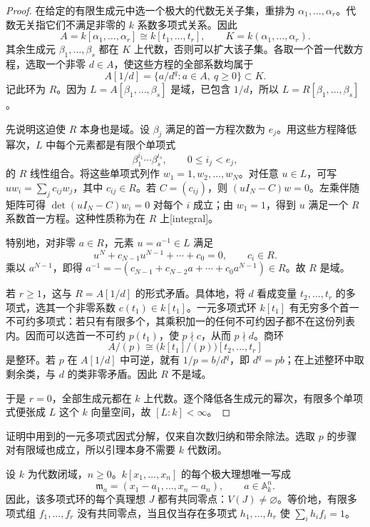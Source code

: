\begin{proof}
	在给定的有限生成元中选一个极大的代数无关子集，重排为 \(\alpha_1,\ldots,\alpha_r\)。代数无关指它们不满足非零的 \(k\) 系数多项式关系。因此
	\[
		A=k[\alpha_1,\ldots,\alpha_r]\cong k[t_1,\ldots,t_r],
		\qquad K=k(\alpha_1,\ldots,\alpha_r).
	\]
	其余生成元 \(\beta_1,\ldots,\beta_s\) 都在 \(K\) 上代数，否则可以扩大该子集。各取一个首一代数方程，选取一个非零 \(d\in A\)，使这些方程的全部系数均属于
	\[
		A[1/d]=\{a/d^q:a\in A,\ q\geq0\}\subset K.
	\]
	记此环为 \(R\)。因为 \(L=A[\beta_1,\ldots,\beta_s]\) 是域，已包含 \(1/d\)，所以 \(L=R[\beta_1,\ldots,\beta_s]\)。

	先说明这迫使 \(R\) 本身也是域。设 \(\beta_j\) 满足的首一方程次数为 \(e_j\)。用这些方程降低幂次，\(L\) 中每个元素都是有限个单项式
	\[
		\beta_1^{i_1}\cdots\beta_s^{i_s},\qquad 0\leq i_j<e_j,
	\]
	的 \(R\) 线性组合。将这些单项式列作 \(w_1=1,w_2,\ldots,w_N\)。对任意 \(u\in L\)，可写 \(uw_i=\sum_jc_{ij}w_j\)，其中 \(c_{ij}\in R\)。若 \(C=(c_{ij})\)，则 \((uI_N-C)w=0\)。左乘伴随矩阵可得 \(\det(uI_N-C)w_i=0\) 对每个 \(i\) 成立；由 \(w_1=1\)，得到 \(u\) 满足一个 \(R\) 系数首一方程。这种性质称为在 \(R\) 上[integral]。

	特别地，对非零 \(a\in R\)，元素 \(u=a^{-1}\in L\) 满足
	\[
		u^N+c_{N-1}u^{N-1}+\cdots+c_0=0,\qquad c_i\in R.
	\]
	乘以 \(a^{N-1}\)，即得 \(a^{-1}=-(c_{N-1}+c_{N-2}a+\cdots+c_0a^{N-1})\in R\)。故 \(R\) 是域。

	若 \(r\geq1\)，这与 \(R=A[1/d]\) 的形式矛盾。具体地，将 \(d\) 看成变量 \(t_2,\ldots,t_r\) 的多项式，选其一个非零系数 \(c(t_1)\in k[t_1]\)。一元多项式环 \(k[t_1]\) 有无穷多个首一不可约多项式：若只有有限多个，其乘积加一的任何不可约因子都不在这份列表内。因而可以选首一不可约 \(p(t_1)\)，使 \(p\nmid c\)，从而 \(p\nmid d\)。商环
	\[
		A/(p)\cong\bigl(k[t_1]/(p)\bigr)[t_2,\ldots,t_r]
	\]
	是整环。若 \(p\) 在 \(A[1/d]\) 中可逆，就有 \(1/p=b/d^q\)，即 \(d^q=pb\)；在上述整环中取剩余类，与 \(d\) 的类非零矛盾。因此 \(R\) 不是域。

	于是 \(r=0\)，全部生成元都在 \(k\) 上代数。逐个降低各生成元的幂次，有限多个单项式便张成 \(L\) 这个 \(k\) 向量空间，故 \([L:k]<\infty\)。
\end{proof}

证明中用到的一元多项式因式分解，仅来自次数归纳和带余除法。选取 \(p\) 的步骤对有限域也成立，所以引理本身不需要 \(k\) 代数闭。

\begin{theorem}[弱零点定理]\label{g5:thm:weak-nullstellensatz}
	设 \(k\) 为代数闭域，\(n\geq0\)。\(k[x_1,\ldots,x_n]\) 的每个极大理想唯一写成
	\[
		\mathfrak m_a=(x_1-a_1,\ldots,x_n-a_n),\qquad a\in\mathbb A_k^n.
	\]
	因此，该多项式环的每个真理想 \(J\) 都有共同零点：\(V(J)\ne\varnothing\)。等价地，有限多项式组 \(f_1,\ldots,f_r\) 没有共同零点，当且仅当存在多项式 \(h_1,\ldots,h_r\) 使 \(\sum_i h_if_i=1\)。
\end{theorem}

